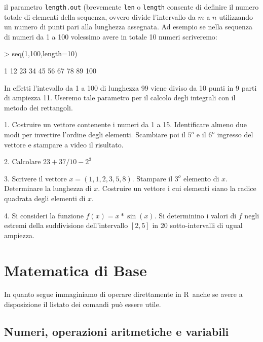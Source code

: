 \documentclass[onecolumn,11pt]{book}
\newcommand{\rpr}{\textsf{R}~}
\begin{document}
il parametro \texttt{length.out}  (brevemente \texttt{len} o \texttt{length} consente di definire il numero totale di elementi della sequenza, ovvero divide l'intervallo  da $m$ a $n$ utilizzando un numero di punti pari alla lunghezza assegnata.
Ad esempio se nella  sequenza di numeri da 1 a 100 volessimo avere in totale 10 numeri scriveremo:
\begin{Schunk}
\begin{Sinput}
> seq(1,100,length=10)
\end{Sinput}
\begin{Soutput}
 [1]   1  12  23  34  45  56  67  78  89 100
\end{Soutput}
\end{Schunk}
In effetti l'intevallo da 1 a 100  di lunghezza 99 viene diviso da 10 punti in 9 parti di ampiezza 11. Useremo tale parametro per il calcolo degli integrali con il metodo dei rettangoli.\\
  \begin{shaded}
  \begin{description}
\item{1.} Costruire un vettore contenente i numeri da 1 a 15. Identificare almeno due modi per invertire l'ordine degli elementi. Scambiare poi  il $5^o$  e il $6^o$ ingresso del vettore e stampare a video il risultato.
\item{2.} Calcolare $23+37/10-2^3$
\item{3.} Scrivere il vettore
$x =(1,1,2,3,5,8)$.
Stampare il $3^o$  elemento di $x$. Determinare la lunghezza di $x$.
Costruire un vettore i cui elementi siano la radice quadrata degli elementi di $x$.
\item{4.} Si consideri la funzione $f(x)=x*\sin(x)$. Si determinino i valori di $f$ negli estremi della suddivisione dell'intervallo $[2,5]$  in 20 sotto-intervalli di ugual ampiezza.
\end{description}
\end{shaded}
\chapter{Matematica di Base}
In quanto segue immaginiamo di operare direttamente in \rpr anche se avere a disposizione il listato dei comandi pu\`o essere utile.
\section{Numeri, operazioni aritmetiche e variabili}
\end{document}
